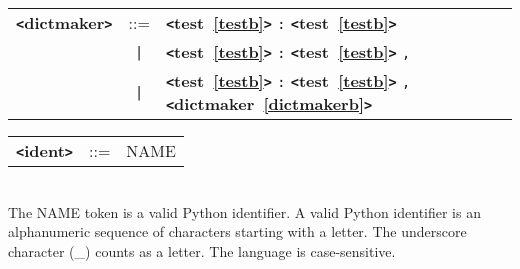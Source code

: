 \documentclass[12pt]{article}
\begin{document}
\label{dictmakerb}
\begin{tabular}{lcl}
{\bf \verb+<+dictmaker\verb+>+} & ::=  & {\bf \verb+<+test~\ref{testb}\verb+>+}  \verb|:| {\bf \verb+<+test~\ref{testb}\verb+>+}  \\
 & \verb+|+  & {\bf \verb+<+test~\ref{testb}\verb+>+}  \verb|:| {\bf \verb+<+test~\ref{testb}\verb+>+}  \verb|,| \\
 & \verb+|+  & {\bf \verb+<+test~\ref{testb}\verb+>+}  \verb|:| {\bf \verb+<+test~\ref{testb}\verb+>+}  \verb|,| {\bf \verb+<+dictmaker~\ref{dictmakerb}\verb+>+}  \\
\end{tabular}

\label{identb}
\begin{tabular}{lcl}
{\bf \verb+<+ident\verb+>+} & ::=  & NAME \\
\end{tabular} \\

The NAME token is a valid Python identifier.  A valid Python identifier is an alphanumeric sequence of characters starting with a letter.  The underscore character (\_) counts as a letter.  The language is case-sensitive.
\end{document}
